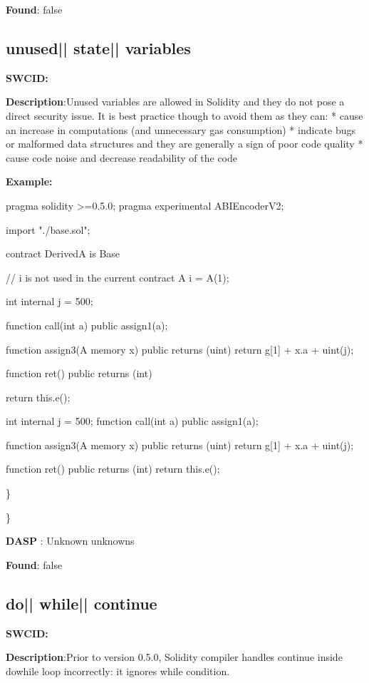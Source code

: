 \documentclass{article}
\begin{document}
\textbf{Found}: false

\subsection{unused{|\textunderscore| }state{|\textunderscore| }variables} 
\textbf{SWC{\textunderscore }ID:} 

\textbf{Description}:Unused variables are allowed in Solidity and they do not pose a direct security issue. It is best practice though to avoid them as they can:
* cause an increase in computations (and unnecessary gas consumption)
* indicate bugs or malformed data structures and they are generally a sign of poor code quality
* cause code noise and decrease readability of the code


\textbf{Example:} 
\begin{ffcode} 

pragma solidity >=0.5.0;
pragma experimental ABIEncoderV2;

import "./base.sol";

contract DerivedA is Base {
    // i is not used in the current contract
    A i = A(1);

    int internal j = 500;

    function call(int a) public {
        assign1(a);
    }

    function assign3(A memory x) public returns (uint) {
        return g[1] + x.a + uint(j);
    }

    function ret() public returns (int){
        return this.e();

    }
  int internal j = 500;
function call(int a) public {
        assign1(a);
    }

    function assign3(A memory x) public returns (uint) {
        return g[1] + x.a + uint(j);
    }

    function ret() public returns (int){
        return this.e();
  }
}

\end{ffcode} 
\} 

\} 

\textbf{DASP} : Unknown unknowns

\textbf{Found}: false

\subsection{do{|\textunderscore| }while{|\textunderscore| }continue} 
\textbf{SWC{\textunderscore }ID:} 

\textbf{Description}:Prior to version 0.5.0, Solidity compiler handles continue inside do{\textendash}while loop incorrectly: it ignores while condition.
\end{document}
